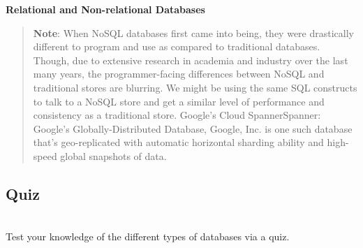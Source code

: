 \textbf{Relational and Non-relational Databases}

\begin{table}[htbp]
\centering
\small
{}
\caption{Relational and Non-relational Databases}
\end{table}

\begin{quote}
\textbf{Note}: When NoSQL databases first came into being, they were drastically different to program and use as compared to traditional databases. Though, due to extensive research in academia and industry over the last many years, the programmer-facing differences between NoSQL and traditional stores are blurring. We might be using the same SQL constructs to talk to a NoSQL store and get a similar level of performance and consistency as a traditional store. Google's Cloud SpannerSpanner: Google's Globally-Distributed Database, Google, Inc. is one such database that's geo-replicated with automatic horizontal sharding ability and high-speed global snapshots of data.
\end{quote}
\subsection{Quiz}\label{ZVoAUOSQnF_jx2rvyNesm}
\\
Test your knowledge of the different types of databases via a quiz.


